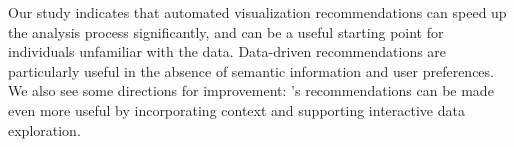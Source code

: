 

 Our study indicates that automated visualization recommendations can speed up the analysis process significantly, and can be a useful starting point for individuals unfamiliar with the data.
Data-driven recommendations are particularly useful in the absence of semantic information and user preferences.
We also see some directions for improvement: \SeeDB's recommendations can be made even more useful by incorporating context and supporting interactive data exploration.
